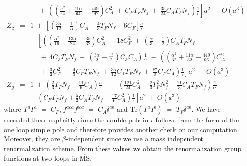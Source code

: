 \documentclass[a4paper,11pt]{article}
\newcommand{\Nf}{N_{\!f}}
\newcommand{\MSbar}{\overline{\mbox{MS}}}
\begin{document}
\begin{eqnarray}
&& \left. ~~~~~+~ \left( \left( \frac{\alpha^2}{64} + \frac{11\alpha}{64} 
- \frac{449}{192} \right) C_A^2 ~+~ C_F T_F \Nf ~+~ \frac{35}{24} C_A T_F \Nf 
\right) \frac{1}{\epsilon} \right] a^2 ~+~ O(a^3) \nonumber \\ 
Z_\beta &=& 1 ~+~ \left[ \left( \frac{35}{12} - \frac{1}{\alpha} \right) C_A  
- \frac{4}{3} T_F \Nf - 6 C_F \right] \frac{a}{\epsilon} \nonumber \\
&& +~ \left[ \left( \left( \frac{\alpha^2}{16} - \frac{13\alpha}{24} 
- \frac{35}{32} \right) C_A^2 ~+~ 18 C_F^2 ~+~ \left( \frac{\alpha}{3} 
+ \frac{1}{2} \right) C_A T_F \Nf \right. \right. \nonumber \\ 
&& \left. \left. ~~~~~~+~ 4 C_F T_F \Nf ~+~ \left( \frac{3\alpha}{2}
- \frac{13}{2} \right) C_F C_A \right) \frac{1}{\epsilon^2} ~-~ \left( 
\left( \frac{\alpha^2}{32} + \frac{11\alpha}{32} - \frac{449}{96} \right) C_A^2
\right. \right. \nonumber \\
&& \left. \left. ~~~~~~+~ \frac{3}{2} C_F^2 ~-~ \frac{4}{3} C_F T_F \Nf ~+~ 
\frac{35}{12} C_A T_F \Nf ~+~ \frac{97}{6} C_F C_A \right) \frac{1}{\epsilon} 
\right] a^2 ~+~ O(a^3) \nonumber \\ 
Z_g &=& 1 ~+~ \left( \frac{2}{3} T_F \Nf - \frac{11}{6} C_A \right) 
\frac{a}{\epsilon} ~+~ \left[ \left( \frac{121}{24}C_A^2 + \frac{2}{3} T_F^2
\Nf^2 - \frac{11}{3} C_A T_F \Nf \right) \frac{1}{\epsilon^2} \right. 
\nonumber \\ 
&& \left. +~ \left( C_F T_F \Nf + \frac{5}{3} C_A T_F \Nf - \frac{17}{6} 
C_A^2 \right) \frac{1}{\epsilon} \right] a^2 ~+~ O(a^3) 
\end{eqnarray}  
where $T^a T^a$ $=$ $C_F$, $f^{acd} f^{bcd}$ $=$ $C_A \delta^{ab}$ and 
$\mbox{Tr}(T^a T^b)$ $=$ $T_F \delta^{ab}$. We have recorded these explicitly
since the double pole in $\epsilon$ follows from the form of the one loop
simple pole and therefore provides another check on our computation. Moreover,
they are $\beta$-independent since we use a mass independent renormalization
scheme. From these values we obtain the renormalization group functions at two 
loops in $\MSbar$,  
\end{document}
